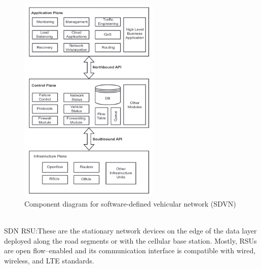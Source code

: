 \documentclass[
  oneside,
  11pt, a4paper,
  footinclude=true,
  headinclude=true,
  cleardoublepage=empty
]{scrbook}
\begin{document}
\begin{figure}[H]
\begin{center}
  \includegraphics[width=0.6\textwidth]{img/sdvn2.png}
\end{center}
  \caption{Component diagram for software-defined vehicular network (SDVN) ~\cite{Bhatia2019sdvn}}
  \centering  
\label{sdvnV}
\end{figure}

SDN RSU:These are the stationary network devices on the edge of the data layer deployed along the road segments or with the cellular base station. Mostly, RSUs are open flow–enabled and its communication interface is compatible with wired, wireless, and LTE standards.\par
\end{document}
